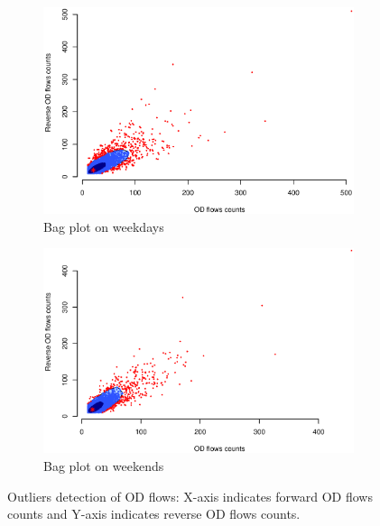\documentclass[a4paper,UKenglish]{lipics-v2016}
\begin{document}
\begin{figure}
	\centering
	\begin{subfigure}[b]{0.49\textwidth}
		\includegraphics[width=\textwidth]{images/OD_weekdays.eps}
		\caption{Bag plot on weekdays}
		\label{fig:weekdays_bag}
	\end{subfigure}
	\hfill %
	\begin{subfigure}[b]{0.49\textwidth}
		\includegraphics[width=\textwidth]{images/OD_weekends.eps}
		\caption{Bag plot on weekends}
		\label{fig:weekends_bag}
	\end{subfigure}
	\caption{Outliers detection of OD flows: X-axis indicates forward OD flows counts and Y-axis indicates reverse OD flows counts.}\label{fig:week_weekends_bag}	
\end{figure}
\end{document}
